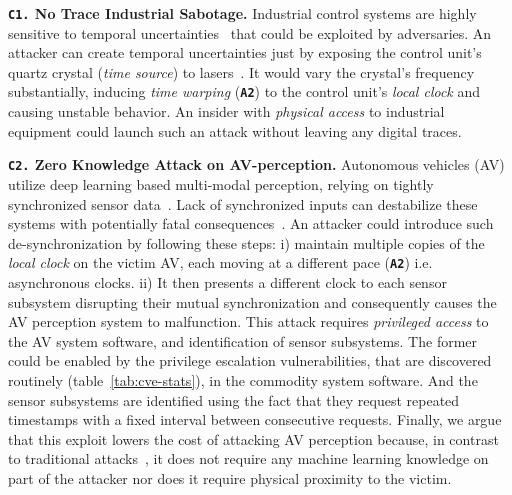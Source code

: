 \noindent\textbf{\texttt{C1.} No Trace Industrial Sabotage.} Industrial control systems are highly sensitive to temporal uncertainties~\cite{hardware-butterfly, hardware-polyrythem} that could be exploited by adversaries. An attacker can create temporal uncertainties just by exposing the control unit's quartz crystal (\textit{time source}) to lasers~\cite{redshift}. It would vary the crystal's frequency substantially, inducing \textit{time warping} (\textbf{\texttt{A2}}) to the control unit's \textit{local clock} and causing unstable behavior. An insider with \textit{physical access} to industrial equipment could launch such an attack without leaving any digital traces. 

\noindent\textbf{\texttt{C2.} Zero Knowledge Attack on AV-perception.} Autonomous vehicles (AV) utilize deep learning based multi-modal perception, relying on tightly synchronized sensor data~\cite{chen2019selectfusion}. Lack of synchronized inputs can destabilize these systems with potentially fatal consequences~\cite{hardware-chronos-slam-attack}. An attacker could introduce such de-synchronization by following these steps: i) maintain multiple copies of the \textit{local clock} on the victim AV, each moving at a different pace (\textbf{\texttt{A2}}) i.e. asynchronous clocks. ii) It then presents a different clock to each sensor subsystem disrupting their mutual synchronization and consequently causes the AV perception system to malfunction. This attack requires \textit{privileged access} to the AV system software, and identification of sensor subsystems. The former could be enabled by the privilege escalation vulnerabilities, that are discovered routinely (table~\ref{tab:cve-stats}), in the commodity system software. And the sensor subsystems are identified using the fact that they request repeated timestamps with a fixed interval between consecutive requests. Finally, we argue that this exploit lowers the cost of attacking AV perception because, in contrast to traditional attacks~\cite{hallyburton2022security, av-spoofing-attack}, it does not require any machine learning knowledge on part of the attacker nor does it require physical proximity to the victim.


